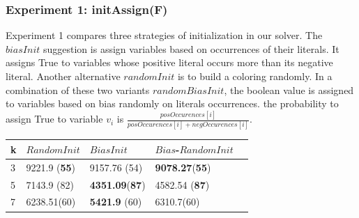 \documentclass[12pt,a4paper,twoside]{scrartcl}
\numberwithin{equation}{section}
\begin{document}
\subsubsection{Experiment 1: initAssign(F)}
\label{sec:Experiment 1}
Experiment 1 compares three strategies of initialization in our solver. The $biasInit$ suggestion is assign variables based on occurrences of their literals. It assigns True to variables whose positive literal occurs more than its negative literal. Another alternative $randomInit$ is to build a coloring randomly. In a combination of these two variants $randomBiasInit$, the boolean value is assigned to variables based on bias randomly on literals occurrences. the probability to assign True to variable $v_i$ is $\frac{posOccurences[i]}{posOccurences[i]+negOccurences[i]}$. \\
\begin{table}[H]
\begin{center}
    \begin{tabular}{|l|l|l|l|p{1cm}|}
\hline 
    k &$RandomInit$&$BiasInit$&$Bias$-$RandomInit$ \\ \hline
	3&9221.9 (\textbf{55})&9157.76 (54)&\textbf{ 9078.27}(\textbf{55}) \\ \hline
	5&7143.9 (82)&\textbf{4351.09}(\textbf{87})&4582.54 (\textbf{87})\\ \hline

	7& 	6238.51(60)&\textbf{5421.9} (60)& 6310.7(60)\\ \hline
	
\end{tabular}
\end{center}
\end{table} 
\end{document}
